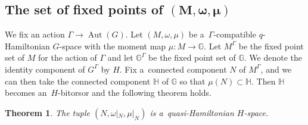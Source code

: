 \documentclass[pdftex]{sigma}
\numberwithin{equation}{section}
\newtheorem{Theorem}{Theorem}[section]
\theoremstyle{definition}
\newcommand{\Aut}{\operatorname{Aut}}
\newcommand{\bG}{\mathbb{G}}
\newcommand{\bH}{\mathbb{H}}
\begin{document}
\subsection[The set of fixed points of (M, omega, mu)]{The set of fixed points of $\boldsymbol{(M, \omega, \mu)}$}

We fix an action $\Gamma \to \Aut(G)$.
Let $(M,\omega, \mu)$ be a~$\Gamma$-compatible $q$-Hamiltonian $G$-space with the moment map $\mu \colon M \to \bG$.
Let $M^{\Gamma}$ be the fixed point set of $M$ for the action of $\Gamma$ and let $\bG^{\Gamma}$ be the fixed point set of $\bG$.
We denote the identity component of $G^{\Gamma}$ by $H$.
Fix a~connected component $N$ of $M^{\Gamma}$, and we can then take the connected component $\bH$ of $\bG$ so that $\mu(N) \subset \bH$.
Then $\bH$ becomes an~$H$-bitorsor and the following theorem holds.

\begin{Theorem}\label{fixed_points_q-Ham}
 The tuple $(N, \omega|_N, \mu|_N)$ is a~quasi-Hamiltonian $H$-space.
\end{Theorem}
\end{document}
